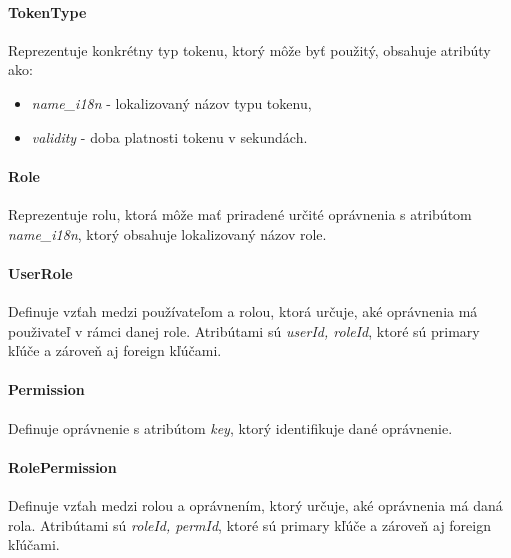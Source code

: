 \paragraph{TokenType} \text{ } \newline
Reprezentuje konkrétny typ tokenu, ktorý môže byť použitý, obsahuje atribúty ako:
\begin{itemize}[itemsep=2pt]
    \item \textit{name\_i18n} - lokalizovaný názov typu tokenu,
    \item \textit{validity} - doba platnosti tokenu v sekundách.
\end{itemize}

\paragraph{Role} \text{ } \newline
Reprezentuje rolu, ktorá môže mať priradené určité oprávnenia s atribútom \textit{name\_i18n}, ktorý obsahuje lokalizovaný názov role.

\paragraph{UserRole} \text{ } \newline
Definuje vzťah medzi používateľom a rolou, ktorá určuje, aké oprávnenia má použivateľ v rámci danej role.
Atribútami sú \textit{userId, roleId}, ktoré sú primary kľúče a zároveň aj foreign kľúčami.

\paragraph{Permission} \text{ } \newline
Definuje oprávnenie s atribútom \textit{key}, ktorý identifikuje dané oprávnenie.

\paragraph{RolePermission} \text{ } \newline
Definuje vzťah medzi rolou a oprávnením, ktorý určuje, aké oprávnenia má daná rola.
Atribútami sú \textit{roleId, permId}, ktoré sú primary kľúče a zároveň aj foreign kľúčami.

